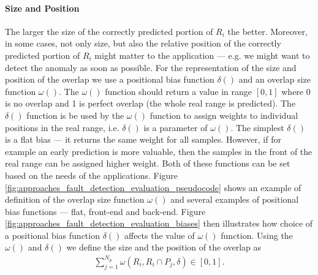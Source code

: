 \paragraph{Size and Position}
The larger the size of the correctly predicted portion of $R_i$ the better.
Moreover, in some cases, not only size, but also the relative position of the correctly predicted portion of $R_i$ might matter to the application --- e.g. we might want to detect the anomaly as soon as possible.
For the representation of the size and position of the overlap we use a positional bias function $\delta()$ and an overlap size function $\omega()$.
The $\omega()$ function should return a value in range $[0, 1]$ where 0 is no overlap and 1 is perfect overlap (the whole real range is predicted).
The $\delta()$ function is be used by the $\omega()$ function to assign weights to individual positions in the real range, i.e. $\delta()$ is a parameter of $\omega()$.
The simplest $\delta()$ is a flat bias --- it returns the same weight for all samples.
However, if for example an early prediction is more valuable, then the samples in the front of the real range can be assigned higher weight.
Both of these functions can be set based on the needs of the applications.
Figure \ref{fig:approaches_fault_detection_evaluation_pseudocode} shows an example of definition of the overlap size function $\omega()$ and several examples of positional bias functions --- flat, front-end and back-end.
Figure \ref{fig:approaches_fault_detection_evaluation_biases} then illustrates how choice of a positional bias function $\delta()$ affects the value of $\omega()$ function.
Using the $\omega()$ and $\delta()$ we define the size and the position of the overlap as
\begin{align*}
    \sum_{j=1}^{N_p}\omega(R_i, R_i \cap P_j, \delta) \in [0, 1].
\end{align*}

